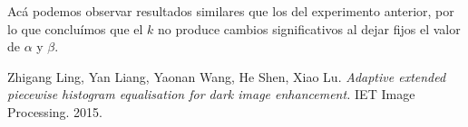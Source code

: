 \documentclass[10pt, a4paper]{article}
\begin{document}
\begin{figure}[H]
\begin{subfigure}{0.3\textwidth}
    \end{subfigure}\hfill
\end{figure}

Acá podemos observar resultados similares que los del experimento anterior, por lo que concluímos que el $k$ no produce cambios significativos al dejar fijos el valor de $\alpha$ y $\beta$.

\newpage 

\begin{thebibliography}{9}
Zhigang Ling, Yan Liang, Yaonan Wang, He Shen, Xiao Lu. \textit{Adaptive extended piecewise histogram equalisation for dark image enhancement.} IET Image Processing. 2015.
\end{thebibliography}
\end{document}

